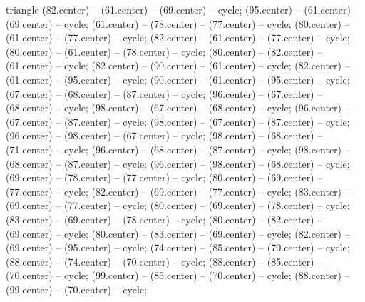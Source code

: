 \begin{pgfonlayer}{triangle}
 (82.center) -- (61.center) -- (69.center) -- cycle; 
 (95.center) -- (61.center) -- (69.center) -- cycle; 
 (61.center) -- (78.center) -- (77.center) -- cycle; 
 (80.center) -- (61.center) -- (77.center) -- cycle; 
 (82.center) -- (61.center) -- (77.center) -- cycle; 
 (80.center) -- (61.center) -- (78.center) -- cycle; 
 (80.center) -- (82.center) -- (61.center) -- cycle; 
 (82.center) -- (90.center) -- (61.center) -- cycle; 
 (82.center) -- (61.center) -- (95.center) -- cycle; 
 (90.center) -- (61.center) -- (95.center) -- cycle; 
 (67.center) -- (68.center) -- (87.center) -- cycle; 
 (96.center) -- (67.center) -- (68.center) -- cycle; 
 (98.center) -- (67.center) -- (68.center) -- cycle; 
 (96.center) -- (67.center) -- (87.center) -- cycle; 
 (98.center) -- (67.center) -- (87.center) -- cycle; 
 (96.center) -- (98.center) -- (67.center) -- cycle; 
 (98.center) -- (68.center) -- (71.center) -- cycle; 
 (96.center) -- (68.center) -- (87.center) -- cycle; 
 (98.center) -- (68.center) -- (87.center) -- cycle; 
 (96.center) -- (98.center) -- (68.center) -- cycle; 
 (69.center) -- (78.center) -- (77.center) -- cycle; 
 (80.center) -- (69.center) -- (77.center) -- cycle; 
 (82.center) -- (69.center) -- (77.center) -- cycle; 
 (83.center) -- (69.center) -- (77.center) -- cycle; 
 (80.center) -- (69.center) -- (78.center) -- cycle; 
 (83.center) -- (69.center) -- (78.center) -- cycle; 
 (80.center) -- (82.center) -- (69.center) -- cycle; 
 (80.center) -- (83.center) -- (69.center) -- cycle; 
 (82.center) -- (69.center) -- (95.center) -- cycle; 
 (74.center) -- (85.center) -- (70.center) -- cycle; 
 (88.center) -- (74.center) -- (70.center) -- cycle; 
 (88.center) -- (85.center) -- (70.center) -- cycle; 
 (99.center) -- (85.center) -- (70.center) -- cycle; 
 (88.center) -- (99.center) -- (70.center) -- cycle; 

\end{pgfonlayer}
